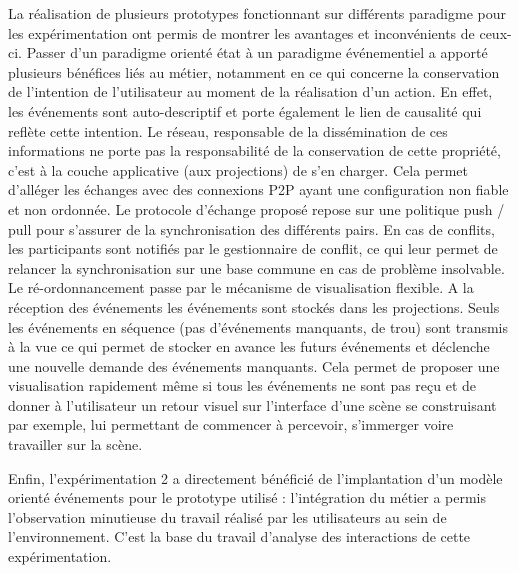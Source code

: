 La réalisation de plusieurs prototypes fonctionnant sur différents 
paradigme pour les expérimentation ont permis de montrer les avantages et 
inconvénients de ceux-ci.
Passer d'un paradigme orienté état à un paradigme événementiel a apporté
plusieurs bénéfices liés au métier, notamment en ce qui concerne la conservation 
de l'intention de l'utilisateur au moment de la réalisation d'un action. En effet, les 
événements sont auto-descriptif et porte également le lien de causalité qui reflète 
cette intention. Le réseau, responsable de la dissémination de ces informations ne 
porte pas la responsabilité de la conservation de cette propriété, c'est à la couche 
applicative (aux projections) de s'en charger. Cela permet d'alléger les échanges 
avec des connexions \gls{P2P} ayant une configuration non fiable et non 
ordonnée. Le protocole d'échange proposé repose sur une politique push / pull pour 
s'assurer de la synchronisation des différents pairs. En cas de conflits, les 
participants sont notifiés par le gestionnaire de conflit, ce qui leur permet de 
relancer la synchronisation sur une base commune en cas de problème insolvable. 
Le ré-ordonnancement passe par le mécanisme de visualisation flexible. A la 
réception des événements les événements sont stockés dans les projections. 
Seuls les événements en séquence (pas d'événements manquants, de \og 
trou\fg{}) sont transmis à la vue ce qui permet de stocker en avance les futurs 
événements et déclenche une nouvelle demande des événements manquants. 
Cela permet de proposer une visualisation rapidement même si tous les 
événements ne sont pas reçu et de donner à l'utilisateur un retour visuel sur 
l'interface d'une scène se construisant par exemple, lui permettant de commencer 
à percevoir, s'immerger voire travailler sur la scène.

Enfin, l'expérimentation 2 a directement bénéficié de l'implantation d'un modèle 
orienté événements pour le prototype utilisé : l'intégration du métier a permis 
l'observation minutieuse du travail réalisé par les utilisateurs au sein de 
l'environnement. C'est la base du travail d'analyse des interactions de cette 
expérimentation.


